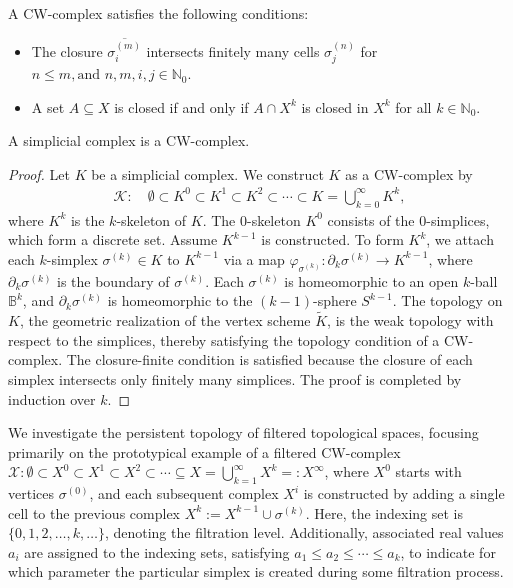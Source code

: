 \begin{remark}
A CW-complex satisfies the following conditions:
\begin{itemize}
    \item The closure \(\overline{\sigma^{(m)}_i}\) intersects finitely many cells \(\sigma^{(n)}_j\) for \(n \leq m, \text{and } n,m,i,j \in \mathbb{N}_0\).
    \item A set \(A \subseteq X\) is closed if and only if \(A \cap X^k\) is closed in \(X^k\) for all \(k \in \mathbb{N}_0\).
\end{itemize}
\end{remark}

\begin{proposition}
A simplicial complex is a CW-complex.
\end{proposition}

\begin{proof}
Let \(K\) be a simplicial complex. We construct \(K\) as a CW-complex by
\begin{align}
\mathcal{K}: \quad \emptyset \subset K^0 \subset K^1 \subset K^2 \subset \cdots \subset K = \bigcup_{k=0}^{\infty} K^k,
\end{align}
where \(K^k\) is the \(k\)-skeleton of \(K\). The $0$-skeleton \(K^0\) consists of the $0$-simplices, which form a discrete set. Assume \(K^{k-1}\) is constructed. To form \(K^k\), we attach each \(k\)-simplex \(\sigma^{(k)} \in K\) to \(K^{k-1}\) via a map \(\varphi_{\sigma^{(k)}} : \partial_{k} \sigma^{(k)} \to K^{k-1}\), where \(\partial_{k} \sigma^{(k)}\) is the boundary of \(\sigma^{(k)}\). Each \(\sigma^{(k)}\) is homeomorphic to an open \(k\)-ball \(\mathbb{B}^{k}\), and \(\partial_{k} \sigma^{(k)}\) is homeomorphic to the \((k-1)\)-sphere \(S^{k-1}\). The topology on \(K\), the geometric realization of the vertex scheme \(\tilde{K}\), is the weak topology with respect to the simplices, thereby satisfying the topology condition of a CW-complex. The closure-finite condition is satisfied because the closure of each simplex intersects only finitely many simplices. The proof is completed by induction over $k$.
\end{proof}

We investigate the persistent topology of filtered topological spaces, focusing primarily on the prototypical example of a filtered CW-complex $\mathcal{X}: \emptyset \subset X^{0} \subset X^{1} \subset X^{2} \subset \cdots \subseteq X = \bigcup_{k=1}^{\infty} X^{k} =: X^\infty$, where \(X^{0}\) starts with vertices \(\sigma^{(0)}\), and each subsequent complex \(X^{i}\) is constructed by adding a single cell to the previous complex $X^{k} := X^{k-1} \cup \sigma^{(k)}$. Here, the indexing set is \(\{0, 1, 2, \ldots, k, \ldots\}\), denoting the filtration level. Additionally, associated real values \(a_{i}\) are assigned to the indexing sets, satisfying \(a_{1} \leq a_{2} \leq \cdots \leq a_{k}\), to indicate for which parameter the particular simplex is created during some filtration process.

